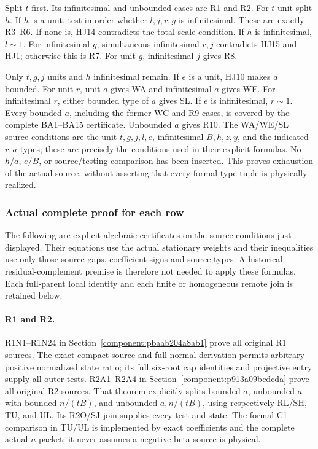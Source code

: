 Split \(t\) first.  Its infinitesimal and unbounded
cases are R1 and R2.
For \(t\) unit split \(h\).
If \(h\) is a unit, test in order whether \(l,j,r,g\)
is infinitesimal.  These are exactly R3--R6.
If none is, HJ14 contradicts the total-scale
condition.
If \(h\) is infinitesimal, \(l\sim1\).
For infinitesimal \(g\), simultaneous infinitesimal
\(r,j\) contradicts HJ15 and HJ1; otherwise this
is R7.
For unit \(g\), infinitesimal \(j\) gives R8.

Only \(t,g,j\) units and \(h\) infinitesimal remain.
If \(e\) is a unit, HJ10 makes \(a\) bounded.
For unit \(r\), unit \(a\) gives WA and infinitesimal
\(a\) gives WE.  For infinitesimal \(r\), either
bounded type of \(a\) gives SL.
If \(e\) is infinitesimal, \(r\sim1\).
Every bounded \(a\), including the former WC and R9 cases,
is covered by the complete BA1--BA15 certificate. Unbounded \(a\)
gives R10. The WA/WE/SL source conditions are the unit \(t,g,j,l,e\),
infinitesimal \(B,h,z,y\), and the indicated \(r,a\) types;
these are precisely the conditions used in their explicit formulas.
No \(h/a\), \(e/B\), or source/testing comparison
has been inserted.  This proves exhaustion of
the actual source, without asserting that every
formal type tuple is physically realized.

\subsubsection*{Actual complete proof for each row}

The following are explicit algebraic certificates on the source
conditions just displayed. Their equations use the actual stationary
weights and their inequalities use only those source gaps, coefficient
signs and source types. A historical residual-complement premise is
therefore not needed to apply these formulas. Each full-parent local
identity and each finite or homogeneous remote join is retained below.

\paragraph{R1 and R2.}
R1N1--R1N24 in
Section~\ref{component:pbaab204a8ab1}
prove all original R1 sources.
The exact compact-source and full-normal derivation
permits arbitrary positive normalized state ratio;
its full six-root cap identities and projective
entry supply all outer tests.
R2A1--R2A4 in
Section~\ref{component:p913a09bcdcda}
prove all original R2 sources.
That theorem explicitly splits bounded \(a\),
unbounded \(a\) with bounded \(n/(tB)\), and
unbounded \(a,n/(tB)\), using respectively
RL/SH, TU, and UL.
Its R2O/SJ join supplies every test and state.
The formal C1 comparison in TU/UL is implemented
by exact coefficients and the complete actual
\(n\) packet; it never assumes a negative-beta
source is physical.

